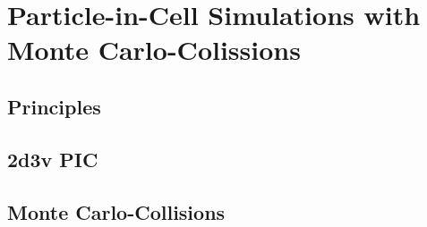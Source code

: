   \section{Particle-in-Cell Simulations with Monte Carlo-Colissions}
%
    \subsection{Principles}
%
    \subsection{2d3v PIC}
%
    \subsection{Monte Carlo-Collisions}
